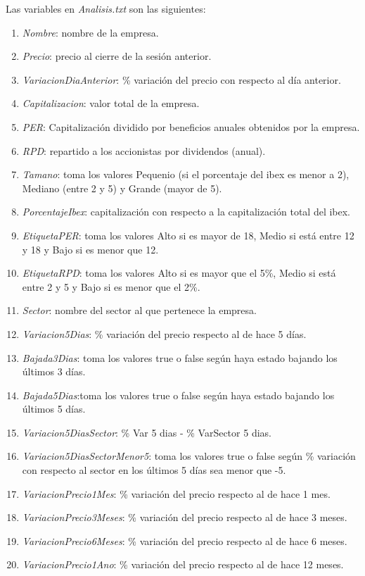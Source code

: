 \documentclass[12pt]{article}
\begin{document}
Las variables en \textit{Analisis.txt} son las siguientes:
\begin{enumerate}
\item \textit{Nombre}: nombre de la empresa.
\item \textit{Precio}: precio al cierre de la sesión anterior.
\item \textit{VariacionDiaAnterior}: \% variación del precio con respecto al día anterior.
\item \textit{Capitalizacion}: valor total de la empresa.
\item \textit{PER}: Capitalización dividido por beneficios anuales obtenidos por la empresa.
\item \textit{RPD}: repartido a los accionistas por dividendos (anual).
\item \textit{Tamano}: toma los valores Pequenio (si el porcentaje del ibex es menor a 2), Mediano (entre 2 y 5) y Grande (mayor de 5).
\item \textit{PorcentajeIbex}: capitalización con respecto a la capitalización total del ibex.
\item \textit{EtiquetaPER}: toma los valores Alto si es mayor de 18, Medio si está entre 12 y 18 y Bajo si es menor que 12.
\item \textit{EtiquetaRPD}: toma los valores Alto si es mayor que el 5\%, Medio si está entre 2 y 5 y Bajo si es menor que el 2\%.
\item \textit{Sector}: nombre del sector al que pertenece la empresa.
\item \textit{Variacion5Dias}: \% variación del precio respecto al de hace 5 días.
\item \textit{Bajada3Dias}: toma los valores true o false según haya estado bajando los últimos 3 días.
\item \textit{Bajada5Dias}:toma los valores true o false según haya estado bajando los últimos 5 días.
\item \textit{Variacion5DiasSector}: \% Var 5 dias - \% VarSector 5 dias.
\item \textit{Variacion5DiasSectorMenor5}: toma los valores true o false según \% variación con respecto al sector en los últimos 5 días sea menor que -5.
\item \textit{VariacionPrecio1Mes}: \% variación del precio respecto al de hace 1 mes.
\item \textit{VariacionPrecio3Meses}: \% variación del precio respecto al de hace 3 meses. 
\item \textit{VariacionPrecio6Meses}: \% variación del precio respecto al de hace 6 meses. 
\item \textit{VariacionPrecio1Ano}: \% variación del precio respecto al de hace 12 meses. 
\end{enumerate}
\textit{ }\\
\end{document}
